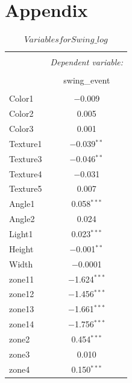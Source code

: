 \documentclass{article}
\begin{document}
\section{Appendix}
\begin{table}[!htbp]  \centering
  \caption{$Variables for Swing\_log$} 
  \label{} 
\begin{tabular}{@{\extracolsep{5pt}}lc} 
\\[-.8ex]\hline 
\hline \\[-.8ex] 
 & \multicolumn{1}{c}{\textit{Dependent variable:}} \\ 
\cline{2-2} 
\\[-.8ex] & swing\_event \\ 
\hline \\[-.8ex] 
 Color1 & $-$0.009 \\ 
 Color2 & 0.005 \\ 
 Color3 & 0.001 \\ 
 Texture1 & $-$0.039$^{**}$ \\ 
 Texture3 & $-$0.046$^{**}$ \\ 
  Texture4 & $-$0.031 \\ 
  
 Texture5 & 0.007 \\ 
 
 Angle1 & 0.058$^{***}$ \\ 
  
 Angle2 & 0.024 \\ 
  
 Light1 & 0.023$^{***}$ \\ 
  
 Height & $-$0.001$^{**}$ \\ 
   
 Width & $-$0.0001 \\ 
   
 zone11 & $-$1.624$^{***}$ \\ 
  
 zone12 & $-$1.456$^{***}$ \\ 
 
 zone13 & $-$1.661$^{***}$ \\ 
 
 zone14 & $-$1.756$^{***}$ \\ 
  
 zone2 & 0.454$^{***}$ \\ 
  
 zone3 & 0.010 \\ 
 
 zone4 & 0.150$^{***}$ \\ 
  

\end{tabular}
\end{table}
\end{document}
